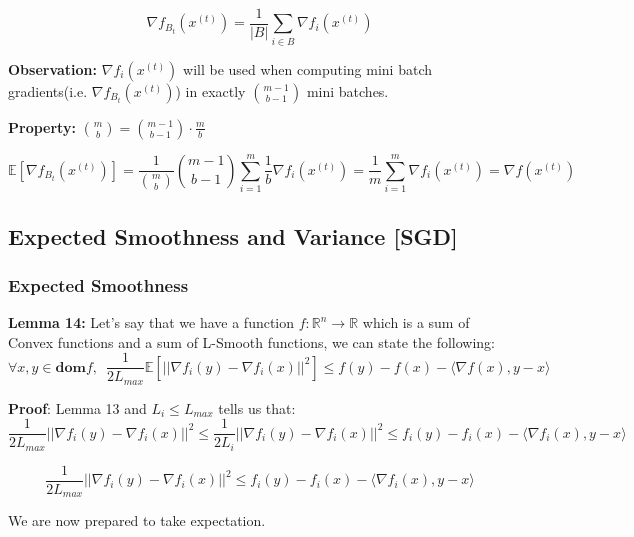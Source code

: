 \begin{equation}
    \nabla f_{B_t}(x^{(t)}) = \frac{1}{|B|} \sum_{i \in B} \nabla f_{i}(x^{(t)})
\end{equation}

\noindent \textbf{Observation:} $\nabla f_i(x^{(t)})$ will be used when computing mini batch gradients(i.e. $\nabla f_{B_t}(x^{(t)})$) in exactly $\binom{m - 1}{b - 1}$ mini batches. 

\noindent \textbf{Property:} $\binom{m}{b} = \binom{m - 1}{b - 1} \cdot \frac{m}{b}$

\begin{equation}
    \mathbb{E}[\nabla f_{B_t}(x^{(t)})] = \frac{1}{\binom{m}{b}} \binom{m - 1}{b - 1} \sum_{i = 1}^{m} \frac{1}{b}\nabla f_{i}(x^{(t)}) = \frac{1}{m} \sum_{i = 1}^{m} \nabla f_{i}(x^{(t)}) = \nabla f(x^{(t)})
\end{equation}

\subsection{Expected Smoothness and Variance [SGD]}
\subsubsection{Expected Smoothness}
\noindent \textbf{Lemma 14:} Let's say that we have a function $f: \mathbb{R}^n \rightarrow \mathbb{R}$ which is a sum of Convex functions and a sum of L-Smooth functions, we can state the following: 
\begin{equation}
    \forall x, y \in \textbf{dom} f, \enspace \frac{1}{2L_{max}} \mathbb{E}[||\nabla f_i(y) - \nabla f_i(x)||^2] \leq f(y) - f(x) - \langle \nabla f(x), y - x \rangle
\end{equation}

\noindent \textbf{Proof}: 
Lemma 13 and $L_i \leq L_{max}$ tells us that: 
\begin{equation}
    \frac{1}{2L_{max}} ||\nabla f_i(y) - \nabla f_i(x)||^2 \leq \frac{1}{2L_i} ||\nabla f_i(y) - \nabla f_i(x)||^2 \leq f_i(y) - f_i(x) - \langle \nabla f_i(x), y - x \rangle
\end{equation}

\begin{equation}
    \frac{1}{2L_{max}} ||\nabla f_i(y) - \nabla f_i(x)||^2 \leq f_i(y) - f_i(x) - \langle \nabla f_i(x), y - x \rangle
\end{equation}



\noindent We are now prepared to take expectation. 

